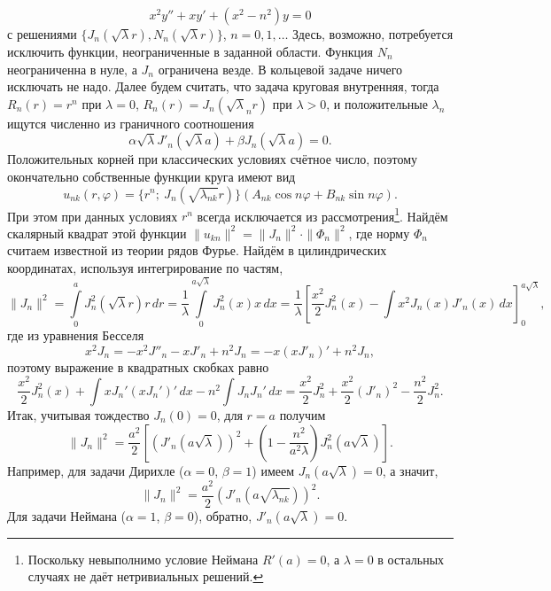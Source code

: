 \[
x^2y'' + xy' + (x^2 - n^2) y = 0
\]
с решениями $ \{J_n(\sqrt \lambda r), N_n(\sqrt\lambda r)\} $, $ n = 0, 1, \ldots $
Здесь, возможно, потребуется исключить функции, неограниченные в
заданной области. Функция $ N_n $ неограниченна в нуле, а $ J_n $ ограничена
везде.
В кольцевой задаче ничего исключать не надо. Далее будем считать, что задача
круговая внутренняя, тогда $ R_n(r) = r^n $ при $ \lambda = 0 $, $ R_n(r) =
J_n(\sqrt\lambda_n r) $ при $ \lambda > 0 $, и положительные $
\lambda_n $ ищутся
численно из
граничного соотношения  
\[
\alpha \sqrt\lambda J'_n(\sqrt\lambda a) + \beta J_n(\sqrt\lambda a) = 0.
\]
Положительных корней при классических условиях счётное число, поэтому окончательно собственные функции
круга имеют вид 
\[
u_{nk}(r, \varphi) = \{r^n; \ J_n(\sqrt{\lambda_{nk}} r)\}(A_{nk}\cos n\varphi +
B_{nk}\sin
n\varphi).
\]
При этом при данных условиях $ r^n $ всегда исключается из
рассмотрения\footnote{Поскольку невыполнимо условие Неймана $ R'(a) = 0 $, а $
	\lambda = 0 $ в остальных случаях не даёт нетривиальных решений.}. Найдём скалярный квадрат этой функции $ \|u_{kn}\|^2 =
\|J_n\|^2\cdot\|\Phi_n\|^2 $, где норму $ \Phi_n $ считаем известной из
теории рядов Фурье. Найдём в цилиндрических координатах, используя
интегрирование по частям,
\[
\|J_n\|^2 = \int\limits_{0}^{a} J^2_n(\sqrt\lambda r)r\,dr =
\frac{1}{\lambda}\int\limits_{0}^{a\sqrt\lambda}J^2_n(x)x\,dx =
\frac{1}{\lambda} \left[ \frac{x^2}{2}J^2_n(x) -
\int x^2 J_n(x)J'_n(x)\,dx  \right]^{a\sqrt\lambda}_0,
\]
где из уравнения Бесселя
\[
x^2 J_n = -x^2 J''_n - xJ'_n + n^2J_n = - x(xJ'_n)' + n^2 J_n,
\]
поэтому выражение в квадратных скобках равно
\[
\frac{x^2}{2} J^2_n(x) + \int xJ_n' (xJ_n')'\,dx - n^2 \int J_n J_n' \, dx
=
\frac{x^2}{2} J^2_n + \frac{x^2}{2} (J'_n)^2 - \frac{n^2}{2} J^2_n.
\]
Итак, учитывая тождество $ J_n(0) = 0 $, для $ r = a $ получим
\[
\|J_n\|^2 = \frac{a^2}{2} \left[ (J'_n(a\sqrt\lambda))^2 + \left( 1 -
\frac{n^2}{a^2\lambda} \right) J_n^2 (a\sqrt\lambda) \right].
\]
Например, для задачи Дирихле ($ \alpha = 0 $, $ \beta = 1 $) имеем $
J_n(a\sqrt\lambda) = 0 $, а значит,  
\[
\|J_n\|^2 = \frac{a^2}{2} (J'_n(a\sqrt{\lambda_{nk}}))^2.
\]
Для задачи Неймана ($ \alpha = 1 $, $ \beta = 0 $), обратно, $ J'_n(a\sqrt\lambda) = 0. $

